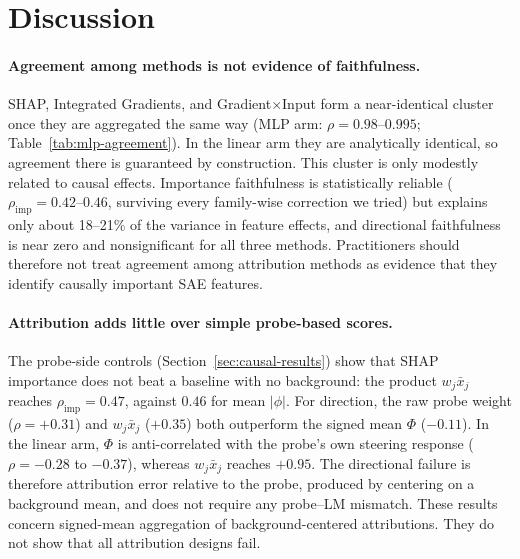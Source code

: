 
\section{Discussion}

\paragraph{Agreement among methods is not evidence of faithfulness.}
SHAP, Integrated Gradients, and Gradient$\times$Input form a near-identical cluster once they are aggregated the same way (MLP arm: $\rho = 0.98$--$0.995$; Table~\ref{tab:mlp-agreement}). In the linear arm they are analytically identical, so agreement there is guaranteed by construction. This cluster is only modestly related to causal effects. Importance faithfulness is statistically reliable ($\rho_{\text{imp}} = 0.42$--$0.46$, surviving every family-wise correction we tried) but explains only about 18--21\% of the variance in feature effects, and directional faithfulness is near zero and nonsignificant for all three methods. Practitioners should therefore not treat agreement among attribution methods as evidence that they identify causally important SAE features.

\paragraph{Attribution adds little over simple probe-based scores.}
The probe-side controls (Section~\ref{sec:causal-results}) show that SHAP importance does not beat a baseline with no background: the product $w_j \bar{x}_j$ reaches $\rho_{\text{imp}} = 0.47$, against $0.46$ for mean $|\phi|$. For direction, the raw probe weight ($\rho = +0.31$) and $w_j \bar{x}_j$ ($+0.35$) both outperform the signed mean $\Phi$ ($-0.11$). In the linear arm, $\Phi$ is anti-correlated with the probe's own steering response ($\rho = -0.28$ to $-0.37$), whereas $w_j \bar{x}_j$ reaches $+0.95$. The directional failure is therefore attribution error relative to the probe, produced by centering on a background mean, and does not require any probe--LM mismatch. These results concern signed-mean aggregation of background-centered attributions. They do not show that all attribution designs fail.

